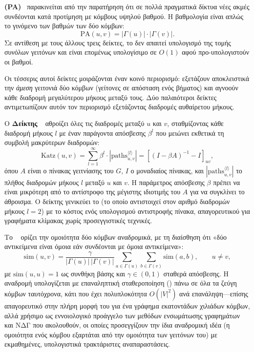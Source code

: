 \textbf{ (PA)}~\cite{barabasi1999emergence}
παρακινείται από την παρατήρηση ότι σε πολλά πραγματικά δίκτυα νέες ακμές
συνδέονται κατά προτίμηση με κόμβους υψηλού βαθμού.
Η βαθμολογία είναι απλώς το
γινόμενο των βαθμών των δύο κόμβων:
\begin{equation}
    \mathrm{PA}(u, v) = |\Gamma(u)| \cdot |\Gamma(v)|.
    \label{eq:pa}
\end{equation}
Σε αντίθεση με τους άλλους τρεις δείκτες, το  δεν απαιτεί υπολογισμό της τομής
συνόλων γειτόνων και είναι επομένως υπολογίσιμο σε $O(1)$ αφού προ-υπολογιστούν οι
βαθμοί.

Οι τέσσερις αυτοί δείκτες μοιράζονται έναν κοινό περιορισμό: εξετάζουν αποκλειστικά
την \textit{άμεση} γειτονιά δύο κόμβων (γείτονες σε απόσταση ενός βήματος) και
αγνοούν κάθε διαδρομή μεγαλύτερου μήκους μεταξύ τους.
Δύο παλαιότεροι δείκτες
αντιμετωπίζουν αυτόν τον περιορισμό εξετάζοντας διαδρομές αυθαίρετου μήκους.

Ο \textbf{Δείκτης }~\cite{katz1953status} αθροίζει όλες τις διαδρομές μεταξύ
$u$ και $v$, σταθμίζοντας κάθε διαδρομή μήκους $l$ με έναν παράγοντα απόσβεσης
$\beta^l$ που μειώνει εκθετικά τη συμβολή μακρύτερων διαδρομών:
\begin{equation}
    \mathrm{Katz}(u, v) = \sum_{l=1}^{\infty} \beta^l \cdot |\mathrm{paths}_{u,v}^{\langle l \rangle}|
    = \left[(I - \beta A)^{-1} - I\right]_{uv},
    \label{eq:katz}
\end{equation}
όπου $A$ είναι ο πίνακας γειτνίασης του $G$, $I$ ο μοναδιαίος πίνακας, και
$|\mathrm{paths}_{u,v}^{\langle l \rangle}|$ το πλήθος διαδρομών μήκους $l$ μεταξύ
$u$ και $v$.
Η παράμετρος απόσβεσης $\beta$ πρέπει να είναι μικρότερη από το
αντίστροφο της μέγιστης ιδιοτιμής του $A$ για να συγκλίνει το άθροισμα.
Ο δείκτης  γενικεύει το  (το οποίο αντιστοιχεί στον αριθμό
διαδρομών μήκους $l=2$)
με το κόστος ενός υπολογισμού αντιστροφής πίνακα, απαγορευτικού για γραφήματα
κλίμακας  χωρίς προσεγγιστικές τεχνικές.

Το \textbf{}~\cite{jehwidom2002simrank} ορίζει την ομοιότητα δύο κόμβων
αναδρομικά, με τη διαίσθηση ότι «δύο αντικείμενα είναι όμοια εάν συνδέονται με
όμοια αντικείμενα»:
\begin{equation}
    \mathrm{sim}(u, v) = \frac{\gamma}{|\Gamma(u)| \, |\Gamma(v)|} \sum_{a \in \Gamma(u)} \sum_{b \in \Gamma(v)} \mathrm{sim}(a, b), \qquad u \neq v,
    \label{eq:simrank}
\end{equation}
με $\mathrm{sim}(u, u) = 1$ ως συνθήκη βάσης και $\gamma \in (0, 1)$ σταθερά απόσβεσης.
Η αναδρομή υπολογίζεται με επαναληπτική σταθεροποίηση ()
πάνω σε όλα τα ζεύγη κόμβων ταυτόχρονα, κάτι που έχει πολυπλοκότητα $O(|V|^2)$ ανά
επανάληψη---επίσης απαγορευτικό στην πλήρη μορφή του για ένα γράφημα εκατοντάδων
χιλιάδων κόμβων, αλλά χρήσιμο ως εννοιολογικό προάγγελο των μεθόδων ενσωμάτωσης
γραφημάτων και ΝΔΓ που ακολουθούν, οι οποίες προσεγγίζουν την ίδια αναδρομική ιδέα
(η ομοιότητα ενός κόμβου εξαρτάται από την ομοιότητα των γειτόνων του) με
εκμαθημένες, υπολογιστικά τρακτάριστες αναπαραστάσεις.

